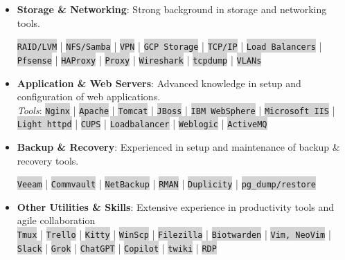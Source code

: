 \documentclass[11pt]{article}
\begin{document}
\begin{itemize}
		\item \textbf{Storage \& Networking}: Strong background in storage and networking tools.
		
		\colorbox{lightgrey}{\texttt{RAID/LVM}} | \colorbox{lightgrey}{\texttt{NFS/Samba}} | \colorbox{lightgrey}{\texttt{VPN}} | \colorbox{lightgrey}{\texttt{GCP Storage}} | \colorbox{lightgrey}{\texttt{TCP/IP}} |
		\colorbox{lightgrey}{\texttt{Load Balancers}} |
		\colorbox{lightgrey}{\texttt{Pfsense}} |
		\colorbox{lightgrey}{\texttt{HAProxy}} |
		\colorbox{lightgrey}{\texttt{Proxy}} |
		\colorbox{lightgrey}{\texttt{Wireshark}} | \colorbox{lightgrey}{\texttt{tcpdump}} | \colorbox{lightgrey}{\texttt{VLANs}}
		
		\item \textbf{Application \& Web Servers}: Advanced knowledge in setup and configuration of web applications. \\	\textit{Tools}: 
		\colorbox{lightgrey}{\texttt{Nginx}} | \colorbox{lightgrey}{\texttt{Apache}} | \colorbox{lightgrey}{\texttt{Tomcat}} | \colorbox{lightgrey}{\texttt{JBoss}} | \colorbox{lightgrey}{\texttt{IBM WebSphere}} |
		\colorbox{lightgrey}{\texttt{Microsoft IIS}} | \colorbox{lightgrey}{\texttt{Light httpd}} | \colorbox{lightgrey}{\texttt{CUPS}} | \colorbox{lightgrey}{\texttt{Loadbalancer}} |
		\colorbox{lightgrey}{\texttt{Weblogic}} | \colorbox{lightgrey}{\texttt{ActiveMQ}}
		
		\item \textbf{Backup \& Recovery}: Experienced in setup and maintenance of backup \& recovery tools.
		
		\colorbox{lightgrey}{\texttt{Veeam}} | \colorbox{lightgrey}{\texttt{Commvault}} | \colorbox{lightgrey}{\texttt{NetBackup}} | \colorbox{lightgrey}{\texttt{RMAN}} | \colorbox{lightgrey}{\texttt{Duplicity}} | \colorbox{lightgrey}{\texttt{pg\_dump/restore}}
		
		\item \textbf{Other Utilities \& Skills}: Extensive experience in productivity tools and agile collaboration 
		\\
		\colorbox{lightgrey}{\texttt{Tmux}} | \colorbox{lightgrey}{\texttt{Trello}} | \colorbox{lightgrey}{\texttt{Kitty}} | \colorbox{lightgrey}{\texttt{WinScp}} | \colorbox{lightgrey}{\texttt{Filezilla}} | \colorbox{lightgrey}{\texttt{Biotwarden}} | \colorbox{lightgrey}{\texttt{Vim, NeoVim}} | \colorbox{lightgrey}{\texttt{Slack}} | \colorbox{lightgrey}{\texttt{Grok}} | \colorbox{lightgrey}{\texttt{ChatGPT}} | \colorbox{lightgrey}{\texttt{Copilot}} | \colorbox{lightgrey}{\texttt{twiki}} | \colorbox{lightgrey}{\texttt{RDP}}
	\end{itemize} \vspace{-1.8em}
	
\end{document}
